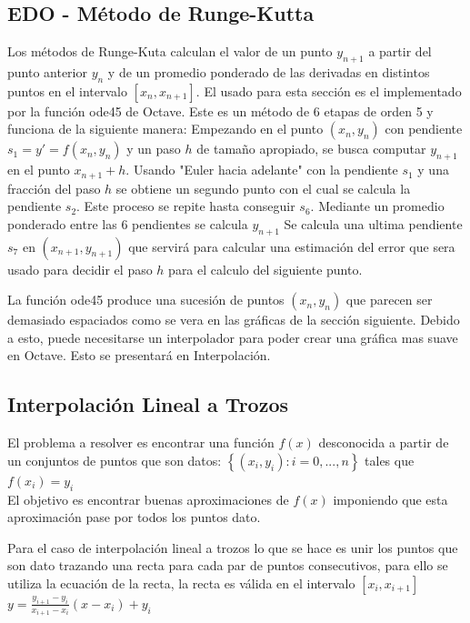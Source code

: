 \documentclass{endm}
\begin{document}
\subsection{EDO - Método de Runge-Kutta}
Los métodos de Runge-Kuta calculan el valor de un punto $y_{n+1}$ a partir del punto anterior $y_n$ y de
un promedio ponderado de las derivadas en distintos puntos en el intervalo $[x_n, x_{n+1}]$.
El usado para esta sección es el implementado por la función ode45 de Octave.
Este es un método de 6 etapas de orden 5 y funciona de la siguiente manera:
Empezando en el punto $(x_n,y_n)$ con pendiente $s_1 = y' = f(x_n,y_n)$ y un paso $h$ de tamaño apropiado,
se busca computar $y_{n+1}$ en el punto $x_{n+1} + h$.
Usando "Euler hacia adelante" con la pendiente $s_1$ y una fracción del paso $h$ se obtiene un segundo punto
con el cual se calcula la pendiente $s_2$. Este proceso se repite hasta conseguir $s_6$.
Mediante un promedio ponderado entre las 6 pendientes se calcula $y_{n+1}$
Se calcula una ultima pendiente $s_7$ en $(x_{n+1},y_{n+1})$ que servirá para calcular una estimación
del error que sera usado para decidir el paso $h$ para el calculo del siguiente punto.

La función ode45 produce una sucesión de puntos $(x_n,y_n)$ que parecen ser demasiado espaciados como se vera
en las gráficas de la sección siguiente. Debido a esto, puede necesitarse un interpolador para poder crear una
gráfica mas suave en Octave. Esto se presentará en Interpolación.


\subsection{Interpolación Lineal a Trozos}

El problema a resolver es encontrar una función $f(x)$ desconocida a partir de un conjuntos de puntos que son datos: $ \left \{ (x_i,y_i): i=0,...,n \right \} $ tales que $f(x_i) =y_i$ \\
El objetivo es encontrar buenas aproximaciones de  $f(x)$ imponiendo que esta aproximación pase por todos los puntos dato.

Para el caso de interpolación lineal a trozos lo que se hace es unir los puntos que son dato trazando una recta para cada par de puntos consecutivos, para ello se utiliza la ecuación de la recta, la recta es válida en el intervalo $\left [ x_i,x_{i+1} \right ]$\\
$y=\frac{y_{i+1}-y_i}{x_{i+1}-x_i}(x-x_i)+y_i$\\
\end{document}
